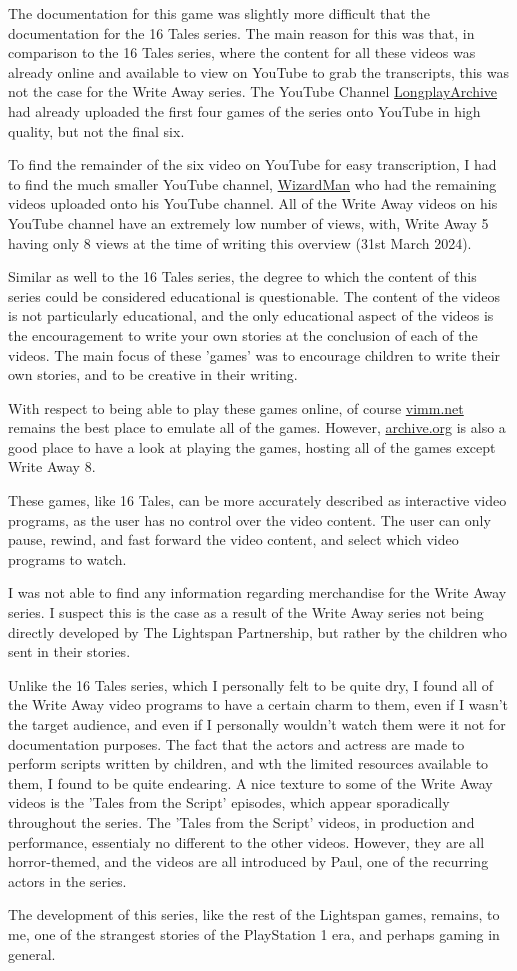 The documentation for this game was slightly more difficult that the documentation for the 16 Tales series.
The main reason for this was that, in comparison to the 16 Tales series, where the content for all these videos was already online and available to view on YouTube to grab the transcripts, this was not the case for the Write Away series.
The YouTube Channel \href{https://www.youtube.com/@longplayarchive}{LongplayArchive} had already uploaded the first four games of the series onto YouTube in high quality, but not the final six.

To find the remainder of the six video on YouTube for easy transcription, I had to find the much smaller YouTube channel, \href{https://www.youtube.com/@WizardmanTonight}{WizardMan} who had the remaining videos uploaded onto his YouTube channel.
All of the Write Away videos on his YouTube channel have an extremely low number of views, with, Write Away 5 having only 8 views at the time of writing this overview (31st March 2024).

Similar as well to the 16 Tales series, the degree to which the content of this series could be considered educational is questionable.
The content of the videos is not particularly educational, and the only educational aspect of the videos is the encouragement to write your own stories at the conclusion of each of the videos.
The main focus of these 'games' was to encourage children to write their own stories, and to be creative in their writing.

With respect to being able to play these games online, of course \href{https://vimm.net}{vimm.net} remains the best place to emulate all of the games.
However, \href{https://archive.org}{archive.org} is also a good place to have a look at playing the games, hosting all of the games except Write Away 8.

These games, like 16 Tales, can be more accurately described as interactive video programs, as the user has no control over the video content.
The user can only pause, rewind, and fast forward the video content, and select which video programs to watch.

I was not able to find any information regarding merchandise for the Write Away series.
I suspect this is the case as a result of the Write Away series not being directly developed by The Lightspan Partnership, but rather by the children who sent in their stories.

Unlike the 16 Tales series, which I personally felt to be quite dry, I found all of the Write Away video programs to have a certain charm to them, even if I wasn't the target audience, and even if I personally wouldn't watch them were it not for documentation purposes.
The fact that the actors and actress are made to perform scripts written by children, and wth the limited resources available to them, I found to be quite endearing.
A nice texture to some of the Write Away videos is the 'Tales from the Script' episodes, which appear sporadically throughout the series.
The 'Tales from the Script' videos, in production and performance, essentialy no different to the other videos.
However, they are all horror-themed, and the videos are all introduced by Paul, one of the recurring actors in the series.

The development of this series, like the rest of the Lightspan games, remains, to me, one of the strangest stories of the PlayStation 1 era, and perhaps gaming in general.